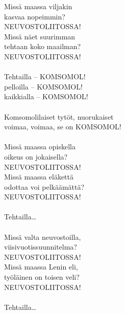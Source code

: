 
            Missä maassa viljakin \\
            kasvaa nopeimmin? \\
            NEUVOSTOLIITOSSA! \\
            Missä näet suurimman \\
            tehtaan koko maailman? \\
            NEUVOSTOLIITOSSA! \\
\hspace{10mm} \\
            Tehtailla – KOMSOMOL! \\
            pelloilla – KOMSOMOL! \\
            kaikkialla – KOMSOMOL! \\
\hspace{10mm} \\
            Komsomolilaiset tytöt, nuorukaiset \\
            voimaa, voimaa, se on KOMSOMOL! \\
\hspace{10mm} \\
            Missä maassa opiskella \\
            oikeus on jokaisella? \\
            NEUVOSTOLIITOSSA! \\
            Missä maassa eläkettä \\
            odottaa voi pelkäämättä? \\
            NEUVOSTOLIITOSSA! \\
\hspace{10mm} \\
            Tehtailla… \\
\hspace{10mm} \\
            Missä valta neuvostoilla, \\
            viisivuotissuunnitelma? \\
            NEUVOSTOLIITOSSA! \\
            Missä maassa Lenin eli, \\
            työläinen on toisen veli? \\
            NEUVOSTOLIITOSSA! \\
\hspace{10mm} \\
            Tehtailla… \\
